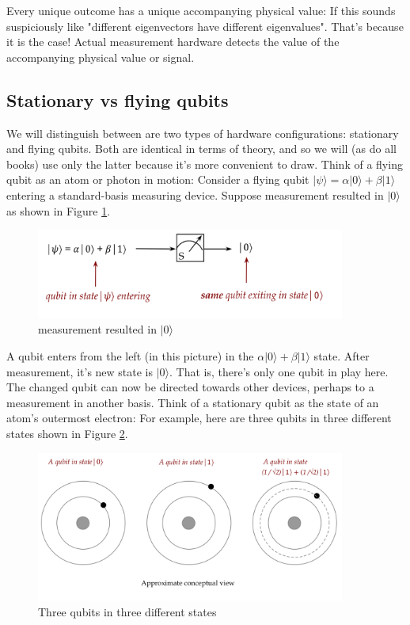 \documentclass[main.tex]{subfiles}
\begin{document}
    Every unique outcome has a unique accompanying physical value: If this sounds suspiciously like "different eigenvectors have different eigenvalues". That's because it is the case! Actual measurement hardware detects the value of the accompanying physical value or signal.

\subsection{Stationary vs flying qubits}

    We will distinguish between are two types of hardware configurations: stationary and flying qubits. Both are identical in terms of theory, and so we will (as do all books) use only the latter because it's more convenient to draw. Think of a flying qubit as an atom or photon in motion: Consider a flying qubit $|\psi\rangle=\alpha|0\rangle+\beta|1\rangle$ entering a standard-basis measuring device. Suppose measurement resulted in $|0\rangle$ as shown in Figure \ref{fig:14qubit8}.
    
    \begin{figure}
        \centering
        \includegraphics[width=4in]{notes/figs/n05/14qubit8.png}
        \caption{measurement resulted in $|0\rangle$}
        \label{fig:14qubit8}
    \end{figure}
    
    A qubit enters from the left (in this picture) in the $\alpha|0\rangle+\beta|1\rangle$ state. After measurement, it's new state is $|0\rangle$. That is, there's only one qubit in play here. The changed qubit can now be directed towards other devices, perhaps to a measurement in another basis. Think of a stationary qubit as the state of an atom's outermost electron: For example, here are three qubits in three different states shown in Figure \ref{fig:15qubit6}.
    
    \begin{figure}
        \centering
        \includegraphics[width=4in]{notes/figs/n05/15qubit6.png}
        \caption{Three qubits in three different states}
        \label{fig:15qubit6}
    \end{figure}
    
\end{document}
